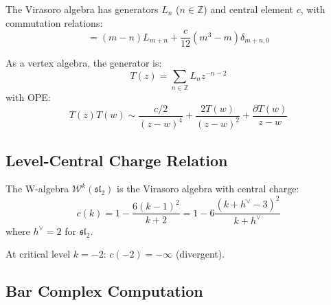 \begin{definition}
The Virasoro algebra has generators $L_n$ ($n \in \mathbb{Z}$) and central element $c$, with commutation relations:
\begin{equation}
[L_m, L_n] = (m-n) L_{m+n} + \frac{c}{12}(m^3 - m)\delta_{m+n,0}
\end{equation}

As a vertex algebra, the generator is:
\begin{equation}
T(z) = \sum_{n \in \mathbb{Z}} L_n z^{-n-2}
\end{equation}
with OPE:
\begin{equation}
T(z)T(w) \sim \frac{c/2}{(z-w)^4} + \frac{2T(w)}{(z-w)^2} + \frac{\partial T(w)}{z-w}
\end{equation}
\end{definition}

\subsection{Level-Central Charge Relation}

\begin{proposition}
The W-algebra $\mathcal{W}^k(\mathfrak{sl}_2)$ is the Virasoro algebra with central charge:
\begin{equation}
c(k) = 1 - \frac{6(k-1)^2}{k+2} = 1 - 6\frac{(k+h^\vee-3)^2}{k+h^\vee}
\end{equation}
where $h^\vee = 2$ for $\mathfrak{sl}_2$.

At critical level $k = -2$: $c(-2) = -\infty$ (divergent).
\end{proposition}

\subsection{Bar Complex Computation}

